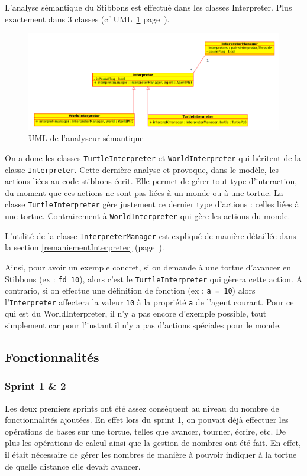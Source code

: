 L'analyse sémantique du Stibbons est effectué dans les classes Interpreter. Plus exactement dans 3 classes (cf UML~\ref{interpreterUML} page~\pageref{interpreterUML}).

\begin{figure}[h]
\caption{\label{interpreterUML} UML de l'analyseur sémantique}
\includegraphics[scale=0.5]{doc/report/uml/interpreterUML.png}
\end{figure}

On a donc les classes \verb|TurtleInterpreter| et \verb|WorldInterpreter| qui héritent de la classe \verb|Interpreter|. Cette dernière analyse et provoque, dans le modèle, les actions liées au code stibbons écrit. Elle permet de gérer tout type d'interaction, du moment que ces actions ne sont pas liées à un monde ou à une tortue. La classe \verb|TurtleInterpreter| gère justement ce dernier type d'actions : celles liées à une tortue. Contrairement à \verb|WorldInterpreter| qui gère les actions du monde.

L'utilité de la classe \verb|InterpreterManager| est expliqué de manière détaillée dans la section \ref{remaniementInterpreter} (page~\pageref{remaniementInterpreter}).

Ainsi, pour avoir un exemple concret, si on demande à une tortue d'avancer en Stibbons (ex : \verb|fd 10|), alors c'est le \verb|TurtleInterpreter| qui gèrera cette action.
A contrario, si on effectue une définition de fonction (ex : \verb|a = 10|) alors l'\verb|Interpreter| affectera la valeur \verb|10| à la propriété \verb|a| de l'agent courant.
Pour ce qui est du WorldInterpreter, il n'y a pas encore d'exemple possible, tout simplement car pour l'instant il n'y a pas d'actions spéciales pour le monde.

\subsection{Fonctionnalités}

\subsubsection{Sprint 1 \& 2}
Les deux premiers sprints ont été assez conséquent au niveau du nombre de fonctionnalités ajoutées.
En effet lors du sprint 1, on pouvait déjà effectuer les opérations de bases sur une tortue, telles que avancer, tourner, écrire, etc. De plus les opérations de calcul ainsi que la gestion de nombres ont été fait. En effet, il était nécessaire de gérer les nombres de manière à pouvoir indiquer à la tortue de quelle distance elle devait avancer.

